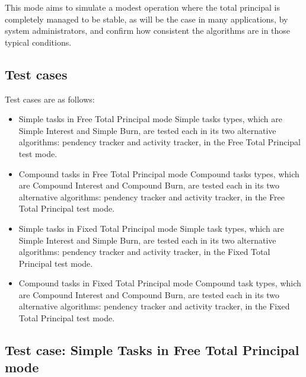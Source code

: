 \documentclass{article}
\begin{document}
\begin{itemize}
  This mode aims to simulate a modest operation where the total principal 
  is completely managed to be stable, as will be the case in many applications, 
  by system administrators, and confirm how consistent the algorithms 
  are in those typical conditions.

\end{itemize}

\subsection{Test cases}
\label{sec:TestCases}

Test cases are as follows:
\newline

\begin{itemize}
  \item {Simple tasks in Free Total Principal mode} \newline
  Simple tasks types, which are Simple Interest and Simple Burn, are tested 
  each in its two alternative algorithms: pendency tracker and activity tracker,
  in the Free Total Principal test mode.
  
  \item {Compound tasks in Free Total Principal mode} \newline
  Compound tasks types, which are Compound Interest and Compound Burn, are tested 
  each in its two alternative algorithms: pendency tracker and activity tracker, 
  in the Free Total Principal test mode.

  \item {Simple tasks in Fixed Total Principal mode} \newline
  Simple task types, which are Simple Interest and Simple Burn, are tested 
  each in its two alternative algorithms: pendency tracker and activity tracker, 
  in the Fixed Total Principal test mode.

  \item {Compound tasks in Fixed Total Principal mode} \newline
  Compound task types, which are Compound Interest and Compound Burn, are tested 
  each in its two alternative algorithms: pendency tracker and activity tracker, 
  in the Fixed Total Principal test mode.

\end{itemize}

\subsection{Test case: Simple Tasks in Free Total Principal mode}
\end{document}
